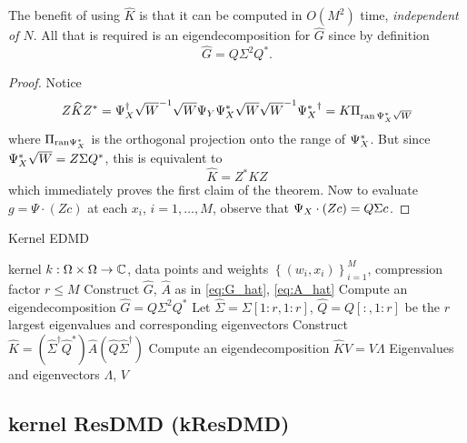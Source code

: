 The benefit of using $\widehat{K}$ is that it can be computed in $O(M^2)$ time, 
\emph{independent of $N$}. All that is required is an eigendecomposition for $\widehat{G}$ 
since by definition 
\begin{equation}
    \widehat{G} = Q \Sigma^2 Q^* . 
\end{equation} 

\begin{proof}
    Notice
    \begin{equation}
        Z \widehat{ K } Z^* 
        = \YX^\dagger \sqrt{W}^{-1} \sqrt{W} \YY \YX^* \sqrt{W} \sqrt{W}^{-1} {\YX^*}^\dagger%
        = K \Pi_{\ran\, \YX^* \sqrt{W}}
    \end{equation}
    where $\Pi_{\text{ran} \Psi_X^*}$ is the orthogonal projection onto the range of $\Psi_X^*$. 
    But since $\Psi_X^* \sqrt{W} = Z \Sigma Q^*$, this is equivalent to 
    \begin{equation}
        \label{eq:Z*_K_Z}
        \widehat{ K } = Z^* K Z
    \end{equation}
    which immediately proves the first claim of the theorem. Now to evaluate 
    $g = \Psi \cdot (Z c)$ at each $x_i$, $i = 1, \ldots, M$, observe 
    that $\Psi_X \cdot (Z c) = Q \Sigma c$. 
\end{proof}

\begin{algorithm}
    \caption{Kernel EDMD}
    \label{alg:kedmd}
    \begin{algorithmic}[1]
        \Require kernel $k : \Omega \times \Omega \to \mathbb{C}$, data points and weights 
            $\left\{ (w_i, x_i) \right\}_{i=1}^M$, compression factor $r \leq M$
        \State Construct $\widehat{G}$, $\widehat{A}$ as in \ref{eq:G_hat}, \ref{eq:A_hat}
        \State Compute an eigendecomposition $\widehat{G} = Q \Sigma^2 Q^*$
        \State Let $\widehat{\Sigma} = \Sigma [1:r, 1:r]$, $\widehat{Q} = Q [:, 1:r]$ be the 
            $r$ largest eigenvalues and corresponding eigenvectors
        \State Construct 
        $\widehat{K} = 
        \left( \widehat{\Sigma}^\dagger \widehat{Q}^* \right)
        \widehat{A}
        \left( \widehat{Q} \widehat{\Sigma}^\dagger \right)$
        \State Compute an eigendecomposition $\widehat{K} V = V \Lambda$
        \State \Return Eigenvalues and eigenvectors $\Lambda$, $V$
    \end{algorithmic}
\end{algorithm}

\subsection{kernel ResDMD (kResDMD)}

